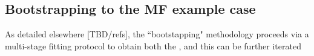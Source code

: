 \subsection{Bootstrapping to the MF example case}

As detailed elsewhere [TBD/refs], the ``bootstapping" methodology proceeds via a multi-stage fitting protocol to obtain both the , and this can be further iterated